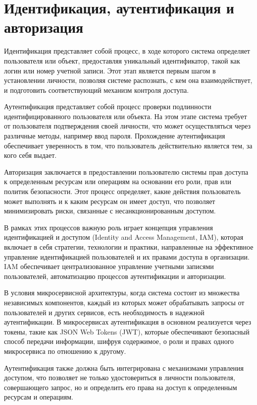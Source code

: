 \section{Идентификация, аутентификация и авторизация}
Идентификация представляет собой процесс, в ходе которого система определяет пользователя или объект, предоставляя уникальный идентификатор, такой как логин или номер учетной записи. Этот этап является первым шагом в установлении личности, позволяя системе распознать, с кем она взаимодействует, и подготовить соответствующий механизм контроля доступа.

Аутентификация представляет собой процесс проверки подлинности идентифицированного пользователя или объекта. На этом этапе система требует от пользователя подтверждения своей личности, что может осуществляться через различные методы, например ввод пароля. Прохождение аутентификация обеспечивает уверенность в том, что пользователь действительно является тем, за кого себя выдает.

Авторизация заключается в предоставлении пользователю системы прав доступа к определенным ресурсам или операциям на основании его роли, прав или политик безопасности. Этот процесс определяет, какие действия пользователь может выполнять и к каким ресурсам он имеет доступ, что позволяет минимизировать риски, связанные с несанкционированным доступом.

В рамках этих процессов важную роль играет концепция управления идентификацией и доступом (Identity and Access Management, IAM), которая включает в себя стратегии, технологии и практики, направленные на эффективное управление идентификацией пользователей и их правами доступа в организации. IAM обеспечивает централизованное управление учетными записями пользователей, автоматизацию процессов аутентификации и авторизации.~\cite{iam}

В условия микросервисной архитектуры, когда система состоит из множества независимых компонентов, каждый из которых может обрабатывать запросы от пользователей и других сервисов, есть необходимость в надежной аутентификации. В микросервисах аутентификация в основном реализуется через токены, такие как JSON Web Tokens (JWT), которые обеспечивают безопасный способ передачи информации, шифруя содержимое, о роли и правах одного микросервиса по отношению к другому.

Аутентификация также должна быть интегрирована с механизмами управления доступом, что позволяет не только удостовериться в личности пользователя, совершающего запрос, но и определить его права на доступ к определенным ресурсам и операциям.

